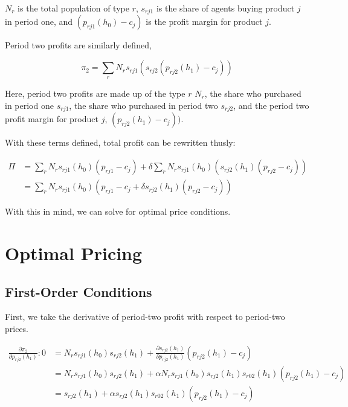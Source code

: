 $N_r$ is the total population of type $r$, $s_{rj1}$ is the share of agents
buying product $j$ in period one, and $(p_{rj1}(h_0) - c_j)$ is the profit
margin for product $j$. 

Period two profits are similarly defined,

\begin{equation}
  \pi_2 = \sum_rN_rs_{rj1}(s_{rj2}(p_{rj2}(h_1) - c_j))
\end{equation}

Here, period two profits are made up of the type $r$ $N_r$, the share who
purchased in period one $s_{rj1}$, the share who purchased in period two
$s_{rj2}$, and the period two profit margin for product $j$, $(p_{rj2}(h_1) - c_j))$.

With these terms defined, total profit can be rewritten thusly:

\begin{align}
  \Pi &= \sum_rN_rs_{rj1}(h_0)(p_{rj1} - c_j) + \delta\sum_rN_rs_{rj1}(h_0)(s_{rj2}(h_1)(p_{rj2} - c_j)) \\
  &= \sum_rN_rs_{rj1}(h_0)(p_{rj1} - c_j + \delta s_{rj2}(h_1)(p_{rj2}-c_j))
\end{align}

With this in mind, we can solve for optimal price conditions.


\section{Optimal Pricing}
\label{sec:optimal-pricing}

\subsection{First-Order Conditions}
\label{subsec:foc}

First, we take the derivative of period-two profit with respect to period-two prices.

\begin{align}
  \frac{\partial\pi_2}{\partial p_{rj2}(h_1)}: 0 &= N_rs_{rj1}(h_0)s_{rj2}(h_1) +
  \frac{\partial s_{rj2}(h_1)}{\partial p_{rj2}(h_1)}(p_{rj2}(h_1) - c_j) \\
  &= N_rs_{rj1}(h_0)s_{rj2}(h_1) + \alpha
  N_rs_{rj1}(h_0)s_{rj2}(h_1)s_{r02}(h_1)(p_{rj2}(h_1) - c_j) \\
  &= s_{rj2}(h_1) + \alpha s_{rj2}(h_1)s_{r02}(h_1)(p_{rj2}(h_1) - c_j)
\end{align}

